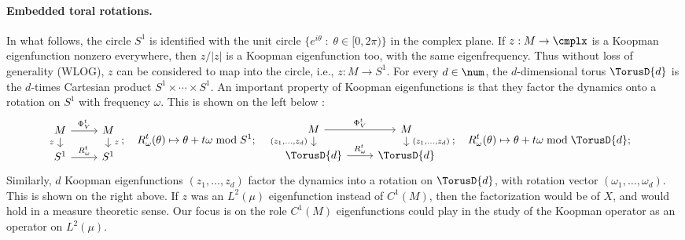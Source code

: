 \documentclass[12pt,oneside]{article}
\begin{document}
\paragraph{Embedded toral rotations.} In what follows, the circle $S^1$ is identified with the unit circle $\{ e^{i\theta} \; : \; \theta\in [0,2\pi)\}$ in the complex plane. If $z:M\to\cmplx$ is a Koopman eigenfunction nonzero everywhere, then $z/|z|$ is a Koopman eigenfunction too, with the same eigenfrequency. Thus without loss of generality (WLOG), $z$ can be considered to map into the circle, i.e., $z:M\to S^1$. For every $d\in\num$, the $d$-dimensional torus $\TorusD{d}$ is the $d$-times Cartesian product  $S^1 \times \cdots \times S^1$. An important property of Koopman eigenfunctions is that they factor the dynamics onto a rotation on $S^1$ with frequency $\omega$. This is shown on the left below : 
%
\begin{equation}\label{eqn:pi_factor}
	\begin{tikzcd}[row sep = small]
		M \arrow[swap]{d}{z\ } \arrow{r}{\Phi^t_V} &M \arrow{d}{\ z} \\
		S^1 \arrow{r}{R_\omega^t} &S^1
	\end{tikzcd}; \quad
	R_\omega^t(\theta) \mapsto \theta+t\omega \bmod S^1; \quad
	\begin{tikzcd}[row sep = small]
		M \arrow[swap]{d}{(z_1,\ldots,z_d)\ } \arrow{r}{\Phi^t_V} &M \arrow{d}{\ (z_1,\ldots,z_d)} \\
		\TorusD{d} \arrow{r}{R_\omega^t} &\TorusD{d}
	\end{tikzcd}; \quad
	R_\omega^t(\theta) \mapsto \theta+t\omega \bmod \TorusD{d}; \quad
\end{equation}
%
Similarly, $d$ Koopman eigenfunctions $(z_1,\ldots,z_d)$ factor the dynamics into a rotation on $\TorusD{d}$, with rotation vector $\left( \omega_1,\ldots,\omega_d \right)$. This is shown on the right above. If $z$ was an $L^2(\mu)$ eigenfunction instead of $C^1(M)$, then the factorization would be of $X$, and would hold in a measure theoretic sense. Our focus is on the role $C^1(M)$ eigenfunctions could play in the study of the Koopman operator as an operator on $L^2(\mu)$.

\begin{figure}[omitted: a diagram of this paper's results, not reproduced here]\label{fig:overview}\end{figure} 
\end{document}
